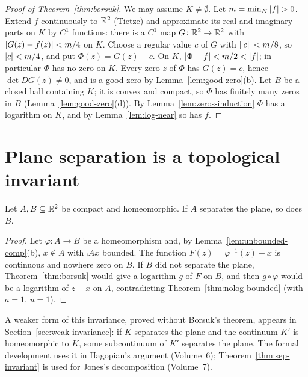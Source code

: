 \begin{proof}[Proof of Theorem~\ref{thm:borsuk}]
We may assume $K\neq\emptyset$. Let $m=\min_K\left\lvert f\right\rvert>0$. Extend $f$ continuously to $\mathbb{R}^2$ (Tietze)
and approximate its real and imaginary parts on $K$ by $C^1$ functions: there is a $C^1$ map
$G\colon\mathbb{R}^2\to\mathbb{R}^2$ with $\left\lvert G(z)-f(z)\right\rvert<m/4$ on $K$. Choose a regular value $c$ of $G$ with
$\lVert c\rVert<m/8$, so $\left\lvert c\right\rvert<m/4$, and put $\Phi(z)=G(z)-c$. On $K$,
$\left\lvert \Phi-f\right\rvert<m/2<\left\lvert f\right\rvert$; in particular $\Phi$ has no zero on $K$. Every zero $z$ of $\Phi$ has
$G(z)=c$, hence $\det DG(z)\neq0$, and is a good zero by Lemma~\ref{lem:good-zero}(b). Let $B$ be a
closed ball containing $K$; it is convex and compact, so $\Phi$ has finitely many zeros in $B$
(Lemma~\ref{lem:good-zero}(d)). By Lemma~\ref{lem:zeros-induction} $\Phi$ has a logarithm on $K$, and
by Lemma~\ref{lem:log-near} so has $f$.
\end{proof}


\section{Plane separation is a topological invariant}

\begin{theorem}\label{thm:sep-invariant}
Let $A,B\subseteq\mathbb{R}^2$ be compact and homeomorphic. If $A$ separates the plane, so does $B$.
\end{theorem}

\begin{proof}
Let $\varphi\colon A\to B$ be a homeomorphism and, by Lemma~\ref{lem:unbounded-comp}(b), $x\notin A$
with $\comp Ax$ bounded. The function $F(z)=\varphi^{-1}(z)-x$ is continuous and nowhere zero on $B$.
If $B$ did not separate the plane, Theorem~\ref{thm:borsuk} would give a logarithm $g$ of $F$ on
$B$, and then $g\circ\varphi$ would be a logarithm of $z-x$ on $A$, contradicting
Theorem~\ref{thm:nolog-bounded} (with $a=1$, $u=1$).
\end{proof}


\begin{remark}
A weaker form of this invariance, proved without Borsuk's theorem, appears in
Section~\ref{sec:weak-invariance}: if $K$ separates the plane and the continuum $K'$ is homeomorphic
to $K$, some subcontinuum of $K'$ separates the plane. The formal development uses it in Hagopian's
argument (Volume~6); Theorem~\ref{thm:sep-invariant} is used for Jones's decomposition (Volume~7).
\end{remark}

